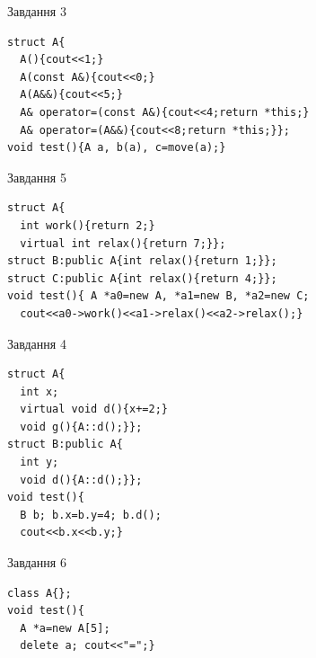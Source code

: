 \documentclass[12pt, ukrainian]{article}
\begin{document}
{{{{\begin{minipage}[t]{11cm}
               
{\begin{center}Завдання {3}\end{center}}
\vspace{-6mm}

\begin{verbatim}
struct A{
  A(){cout<<1;}
  A(const A&){cout<<0;}
  A(A&&){cout<<5;}
  A& operator=(const A&){cout<<4;return *this;}
  A& operator=(A&&){cout<<8;return *this;}};
void test(){A a, b(a), c=move(a);}
\end{verbatim}            


               
{\begin{center}Завдання {5}\end{center}}
\vspace{-6mm}

\begin{verbatim}
struct A{
  int work(){return 2;}
  virtual int relax(){return 7;}};
struct B:public A{int relax(){return 1;}};
struct C:public A{int relax(){return 4;}};
void test(){ A *a0=new A, *a1=new B, *a2=new C;
  cout<<a0->work()<<a1->relax()<<a2->relax();}
\end{verbatim}            


\end{minipage}
\vline \hspace{8mm}
\begin{minipage}[t]{7cm}
               
{\begin{center}Завдання {4}\end{center}}
\vspace{-6mm}

\begin{verbatim}
struct A{
  int x;
  virtual void d(){x+=2;}
  void g(){A::d();}};
struct B:public A{
  int y;
  void d(){A::d();}};
void test(){
  B b; b.x=b.y=4; b.d();
  cout<<b.x<<b.y;}
\end{verbatim}            


               
{\begin{center}Завдання {6}\end{center}}
\vspace{-6mm}

\begin{verbatim}
class A{};
void test(){
  A *a=new A[5]; 
  delete a; cout<<"=";} 
\end{verbatim}            



\end{minipage}}}}}
\end{document}
